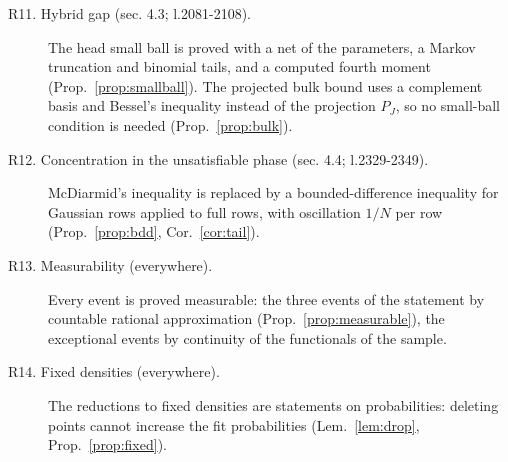 \documentclass[11pt]{article}
\theoremstyle{plain}
\theoremstyle{definition}
\begin{document}
\begin{description}
\item[R11. Hybrid gap (sec. 4.3; l.2081-2108).] The head small ball is proved with a net of the parameters, a Markov truncation and binomial tails, and a computed fourth moment (Prop.~\ref{prop:smallball}). The projected bulk bound uses a complement basis and Bessel's inequality instead of the projection $P_J$, so no small-ball condition is needed (Prop.~\ref{prop:bulk}).
\item[R12. Concentration in the unsatisfiable phase (sec. 4.4; l.2329-2349).] McDiarmid's inequality is replaced by a bounded-difference inequality for Gaussian rows applied to full rows, with oscillation $1/N$ per row (Prop.~\ref{prop:bdd}, Cor.~\ref{cor:tail}).
\item[R13. Measurability (everywhere).] Every event is proved measurable: the three events of the statement by countable rational approximation (Prop.~\ref{prop:measurable}), the exceptional events by continuity of the functionals of the sample.
\item[R14. Fixed densities (everywhere).] The reductions to fixed densities are statements on probabilities: deleting points cannot increase the fit probabilities (Lem.~\ref{lem:drop}, Prop.~\ref{prop:fixed}).
\end{description}
\end{document}

